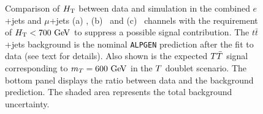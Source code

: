 \begin{figure}[h!tb]\begin{center}
	\caption{Comparison of $\HT$ between data and simulation in the combined
$e$+jets and $\mu$+jets (a) \chii, (b) \chiii\ and (c) \chiv\ channels with 
the requirement of $\HT<700\gev$ to suppress a possible signal contribution.
The $t\bar{t}$+jets background is the nominal \texttt{ALPGEN} prediction after the fit to data (see text for details).
Also shown is the expected $\TT$ signal corresponding to $m_{\T}=600\gev$ in the $\T$ doublet scenario.
The bottom panel displays the ratio between data
and the background prediction. The shaded area represents the total background uncertainty.\label{fig:HT_afterfit}}
\end{center}\end{figure}

